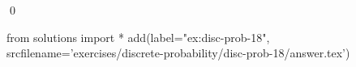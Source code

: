 
\begin{ex} 
  \label{ex:disc-prob-18}
  
  \qed
\end{ex} 
\begin{python0}
from solutions import *
add(label="ex:disc-prob-18",
    srcfilename='exercises/discrete-probability/disc-prob-18/answer.tex') 
\end{python0}

